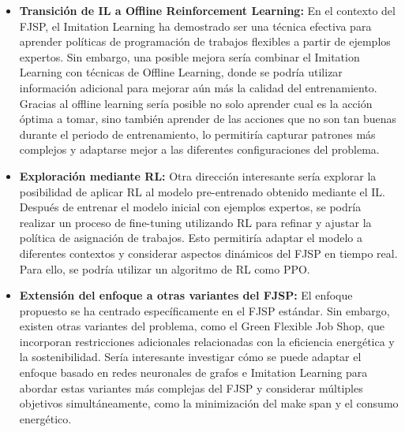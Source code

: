 \begin{itemize}
    \item \textbf{Transición de IL a Offline Reinforcement Learning:} En 
    el contexto del FJSP, el Imitation Learning ha demostrado ser una 
    técnica efectiva para aprender políticas de programación de trabajos 
    flexibles a partir de ejemplos expertos. Sin embargo, una posible mejora 
    sería combinar el Imitation Learning con técnicas de Offline Learning, 
    donde se podría utilizar información adicional para mejorar aún más la 
    calidad del entrenamiento. Gracias al offline learning sería posible no 
    solo aprender cual es la acción óptima a tomar, sino también aprender 
    de las acciones que no son tan buenas durante el periodo de entrenamiento, 
    lo permitiría capturar patrones más complejos y adaptarse mejor a las 
    diferentes configuraciones del problema.
   \item \textbf{Exploración mediante RL:} Otra dirección interesante sería explorar 
   la posibilidad de aplicar RL al modelo pre-entrenado obtenido mediante 
   el IL. Después de entrenar el modelo inicial con ejemplos expertos, 
   se podría realizar un proceso de fine-tuning utilizando RL para refinar 
   y ajustar la política de asignación de trabajos. Esto permitiría adaptar 
   el modelo a diferentes contextos y considerar aspectos dinámicos del 
   FJSP en tiempo real. Para ello, se podría utilizar un algoritmo de
   RL como PPO.
   \item \textbf{Extensión del enfoque a otras variantes del FJSP:} El 
   enfoque propuesto se ha centrado específicamente en el FJSP estándar. 
   Sin embargo, existen otras variantes del problema, como el Green Flexible 
   Job Shop, que incorporan restricciones adicionales relacionadas con la 
   eficiencia energética y la sostenibilidad. Sería interesante investigar 
   cómo se puede adaptar el enfoque basado en redes neuronales de grafos e 
   Imitation Learning para abordar estas variantes más complejas del FJSP y 
   considerar múltiples objetivos simultáneamente, como la minimización del 
   make span y el consumo energético.
\end{itemize}